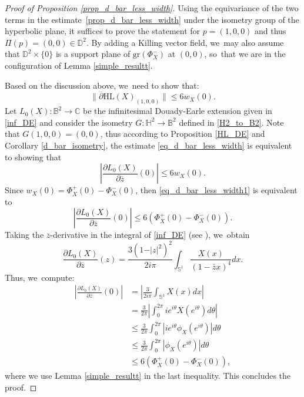 \documentclass[10pt]{amsart}
\theoremstyle{plain}
\theoremstyle{definition}
\begin{document}
\begin{proof}[Proof of Proposition \ref{prop_d_bar_less_width}]
Using the equivariance of the two terms in the estimate~\eqref{prop_d_bar_less_width} under the isometry group of the hyperbolic plane, it suffices to prove the statement for \(p = (1,0,0) \) and thus \(\Pi(p) = (0,0) \in \mathbb{D}^2\). By adding a Killing vector field, we~may also assume that \(\mathbb{D}^2 \times \{0\}\) is a support plane of \(\mathrm{gr}(\Phi_X^-)\) at \((0,0)\), so~that we are in the configuration of Lemma \ref{simple_resultt}.

Based on the discussion above, we~need to show that:
\begin{equation}\label{eq_d_bar_less_width}
\lVert \overline{\partial} \mathrm{HL}(X)_{(1,0,0)} \rVert \leq 6 w_X(0).
\end{equation}
Let \(L_0(X): \mathbb{B}^2 \to \mathbb{C} \) be the infinitesimal Douady-Earle extension given in \eqref{inf_DE} and consider the isometry \(G:\mathbb{H}^2 \to \mathbb{B}^2 \) defined in \eqref{H2_to_B2}. Note that \(G(1,0,0) = (0,0) \), thus according to Proposition \ref{HL_DE} and Corollary \ref{d_bar_isometry}, the estimate \eqref{eq_d_bar_less_width} is equivalent to showing that
\begin{equation}\label{eq_d_bar_less_width1}
\left| \frac{\partial L_0(X)}{\partial \overline{z}}(0) \right| \leq 6 w_X(0).
\end{equation}
Since \(w_X(0) = \Phi_X^+(0) - \Phi_X^-(0) \), then \eqref{eq_d_bar_less_width1} is equivalent to
\[
\left| \frac{\partial L_0(X)}{\partial \overline{z}}(0) \right| \leq 6(\Phi_X^+(0) - \Phi_X^-(0)).
\]
Taking the \(\overline{z}\)-derivative in the integral of \eqref{inf_DE} (see \cite[p.\,380]{Extension_with_bounded_derivative}), we~obtain
\[
\frac{\partial L_0(X)}{\partial \overline{z}}(z) = \frac{3(1 - \vert z \vert^2)^2}{2i\pi} \int_{\mathbb{S}^1} \frac{X(x)}{(1 - \overline{z}x)^4} dx.
\]
Thus, we~compute:
\begin{align*}
\left| \frac{\partial L_0(X)}{\partial \overline{z}}(0) \right| &= \left| \frac{3}{2i\pi} \int_{\mathbb{S}^1} X(x) dx \right| \\
&= \frac{3}{2\pi} \left| \int_{0}^{2\pi} i e^{i\theta} X(e^{i\theta}) d\theta \right| \\
&\leq \frac{3}{2\pi} \int_{0}^{2\pi} \left| i e^{i\theta} \phi_X(e^{i\theta}) \right| d\theta \\
&\leq \frac{3}{2\pi} \int_{0}^{2\pi} \left| \phi_X(e^{i\theta}) \right| d\theta \\
&\leq 6(\Phi_X^+(0) - \Phi_X^-(0)),
\end{align*}
where we use Lemma \ref{simple_resultt} in the last inequality. This concludes the proof.
\end{proof}
\end{document}
